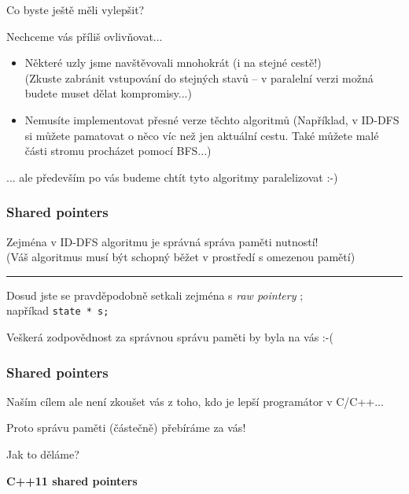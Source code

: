 \documentclass[usenames,dvipsnames,9pt]{beamer}
\begin{document}
\begin{frame}
  Co byste ještě měli vylepšit?

  Nechceme vás příliš ovlivňovat...

  \vspace{1em}

  \begin{itemize}
  	\pause\item {\Large Některé uzly jsme navštěvovali mnohokrát (i na stejné cestě!)} \\
  	            (Zkuste zabránit vstupování do stejných stavů -- v paralelní verzi možná budete muset dělat kompromisy...) \\[0.7em]
  	\pause\item {\Large Nemusíte implementovat přesné verze těchto algoritmů}
  				(Například, v ID-DFS si můžete pamatovat o něco víc než jen aktuální cestu. Také můžete malé části stromu procházet pomocí BFS...)
  \end{itemize}

  \pause\vspace{1em}
  ... ale především po vás budeme chtít tyto algoritmy paralelizovat :-)
\end{frame}

\begin{frame}
  \frametitle{Shared pointers}

  {\Large Zejména v ID-DFS algoritmu je správná správa paměti nutností!} \\
  (Váš algoritmus musí být schopný běžet v prostředí s omezenou pamětí)

  \pause
  \vspace{1em}\hrule\vspace{1em}

  Dosud jste se pravděpodobně setkali zejména s \emph{raw pointery} ; \\
  napříkad \texttt{state * s;}

  \pause\vspace{1em}
  \hfill Veškerá zodpovědnost za správnou správu paměti by byla na vás :-(
\end{frame}

\begin{frame}
  \frametitle{Shared pointers}

  Naším cílem ale není zkoušet vás z toho, kdo je lepší programátor v C/C++...

  Proto správu paměti (částečně) přebíráme za vás!

  \hfill {\large Jak to děláme?}

  \pause\vspace{2em}

  \begin{center}
  	\Large\bf C++11 shared pointers
  \end{center}
\end{frame}
\end{document}
